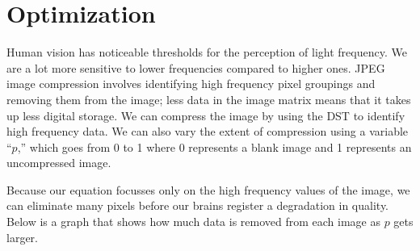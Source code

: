 \section{Optimization}
Human vision has noticeable thresholds for the perception of light frequency. We are a lot more sensitive to lower frequencies compared to higher ones. JPEG image compression involves identifying high frequency pixel groupings and removing them from the image; less data in the image matrix means that it takes up less digital storage.  We can compress the image by using the DST to identify high frequency data. We can also vary the extent of compression using a variable “$p$,” which goes from 0 to 1 where 0 represents a blank image and 1 represents an uncompressed image.

Because our equation focusses only on the high frequency values of the image, we can eliminate many pixels before our brains register a degradation in quality. Below is a graph that shows how much data is removed from each image as $p$ gets larger.

